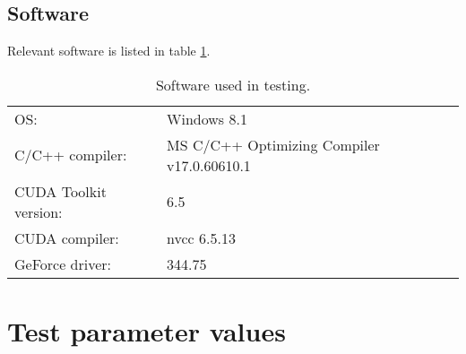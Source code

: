 \subsection{Software}
Relevant software is listed in table \ref{tab:software}.
\begin{table}[!htbp]
\begin{sloppypar}
	\begin{tabular}{|| p{3.5cm} | p{8cm} ||}
	\hline
		OS:& Windows 8.1\\
		C/C++ compiler:& MS C/C++ Optimizing Compiler v17.0.60610.1\\
		CUDA Toolkit version:& 6.5\\
		CUDA compiler:& nvcc 6.5.13\\
		GeForce driver:& 344.75\\
	\hline
	\end{tabular}
\end{sloppypar}
\caption{Software used in testing.}
\label{tab:software}
\end{table}

\section{Test parameter values}
\label{sec:testing-parameters}
